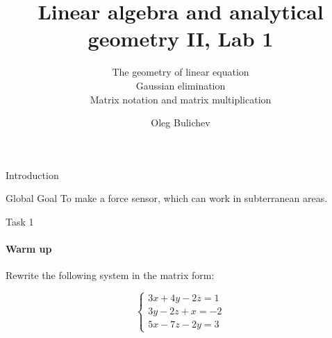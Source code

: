\documentclass[aspectratio=169]{beamer}
\title{Linear algebra and analytical geometry II, Lab 1} %
\subtitle{The geometry of linear equation\\
          Gaussian elimination\\
          Matrix notation and matrix multiplication} %
\author{Oleg Bulichev}
\newcommand{\fbckg}[1]{\usebackgroundtemplate{\texttt{[image: \#1]}}}%
\begin{document}
\fbckg{fibeamer/figs/title_page.png}

\fbckg{fibeamer/figs/common.png}



\begin{frame}[c]{Introduction}
\begin{Large}
    \begin{block}{\Large Global Goal}
        \centering To make a force sensor, which can work in subterranean areas.
    \end{block}
\end{Large}
\end{frame}

\begin{frame}[t]{Task 1}
\framesubtitle{Warm up}
Rewrite the following system in the matrix form:
\begin{Large}
\begin{equation*}
    \left\{\begin{matrix}
       3x + 4y -2z = 1 \\ 
       3y -2z +x = -2 \\ 
       5x - 7z -2y = 3 
       \end{matrix}\right.
\end{equation*}
\end{Large}
\end{frame}
\end{document}
